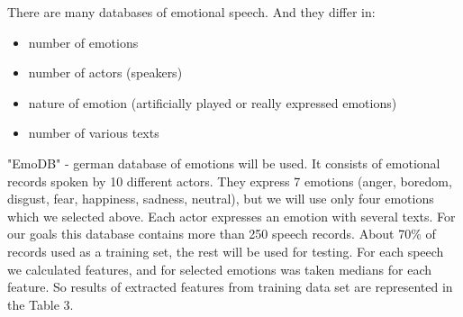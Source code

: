 \documentclass[14pt]{extarticle}
\begin{document}
There are many databases of emotional speech. And they differ in:
\begin{itemize}
	\item number of emotions
	\item number of actors (speakers)
	\item nature of emotion (artificially played or really expressed emotions)
	\item number of various texts
\end{itemize}
"EmoDB"\cite{emodb} - german database of emotions will be used. It consists of emotional records spoken by 10 different actors. They express 7 emotions (anger, boredom, disgust, fear, happiness, sadness, neutral), but we will use only four emotions which we selected above. Each actor expresses an emotion with several texts. For our goals this database contains more than 250 speech records. About 70\% of records used as a training set, the rest will be used for testing. For each speech we calculated features, and for selected emotions was taken medians for each feature. So results of extracted features from training data set are represented in the Table 3.
\end{document}
